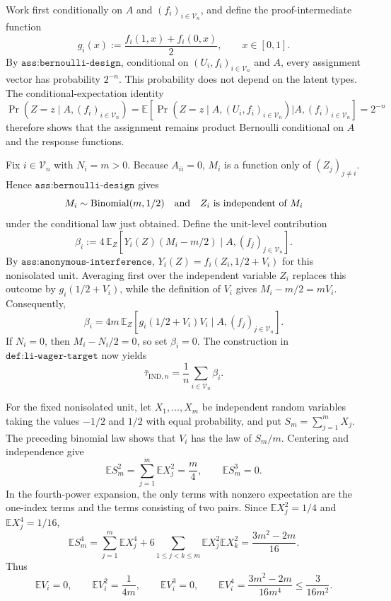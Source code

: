 Work first conditionally on \(A\) and \((f_i)_{i\in\mathcal V_n}\), and define the proof-intermediate function
\[
g_i(x):=\frac{f_i(1,x)+f_i(0,x)}{2},\qquad x\in[0,1].
\]
By \(\texttt{ass:bernoulli-design}\), conditional on \((U_i,f_i)_{i\in\mathcal V_n}\) and \(A\), every assignment vector has probability \(2^{-n}\).  This probability does not depend on the latent types.  The conditional-expectation identity
\[
\Pr\!\left(Z=z\mid A,(f_i)_{i\in\mathcal V_n}\right)
=\mathbb E\!\left[
\Pr\!\left(Z=z\mid A,(U_i,f_i)_{i\in\mathcal V_n}\right)
\mathrel{\big|}A,(f_i)_{i\in\mathcal V_n}
\right]
=2^{-n}
\]
therefore shows that the assignment remains product Bernoulli conditional on \(A\) and the response functions.

Fix \(i\in\mathcal V_n\) with \(N_i=m>0\).  Because \(A_{ii}=0\), \(M_i\) is a function only of \((Z_j)_{j\ne i}\).  Hence \(\texttt{ass:bernoulli-design}\) gives
\[
M_i\sim {\rm Binomial}(m,1/2)
\quad\text{and}\quad
Z_i\ \text{is independent of}\ M_i
\]
under the conditional law just obtained.  Define the unit-level contribution
\[
\beta_i:=4\,\mathbb E_Z\!\left[
Y_i(Z)(M_i-m/2)\mid A,(f_j)_{j\in\mathcal V_n}
\right].
\]
By \(\texttt{ass:anonymous-interference}\), \(Y_i(Z)=f_i(Z_i,1/2+V_i)\) for this nonisolated unit.  Averaging first over the independent variable \(Z_i\) replaces this outcome by \(g_i(1/2+V_i)\), while the definition of \(V_i\) gives \(M_i-m/2=mV_i\).  Consequently,
\[
\beta_i
=4m\,\mathbb E_Z\!\left[
g_i(1/2+V_i)V_i\mid A,(f_j)_{j\in\mathcal V_n}
\right].
\]
If \(N_i=0\), then \(M_i-N_i/2=0\), so set \(\beta_i=0\).  The construction in \(\texttt{def:li-wager-target}\) now yields
\[
\bar\tau_{\mathrm{IND},n}=\frac1n\sum_{i\in\mathcal V_n}\beta_i.
\]

For the fixed nonisolated unit, let \(X_1,\ldots,X_m\) be independent random variables taking the values \(-1/2\) and \(1/2\) with equal probability, and put \(S_m=\sum_{j=1}^mX_j\).  The preceding binomial law shows that \(V_i\) has the law of \(S_m/m\).  Centering and independence give
\[
\mathbb E S_m^2=\sum_{j=1}^m\mathbb E X_j^2=\frac m4,
\qquad
\mathbb E S_m^3=0.
\]
In the fourth-power expansion, the only terms with nonzero expectation are the one-index terms and the terms consisting of two pairs.  Since \(\mathbb E X_j^2=1/4\) and \(\mathbb E X_j^4=1/16\),
\[
\mathbb E S_m^4
=\sum_{j=1}^m\mathbb E X_j^4
+6\sum_{1\le j<k\le m}\mathbb E X_j^2\mathbb E X_k^2
=\frac{3m^2-2m}{16}.
\]
Thus
\[
\mathbb E V_i=0,
\qquad
\mathbb E V_i^2=\frac1{4m},
\qquad
\mathbb E V_i^3=0,
\qquad
\mathbb E V_i^4=\frac{3m^2-2m}{16m^4}\le\frac3{16m^2}.
\]

